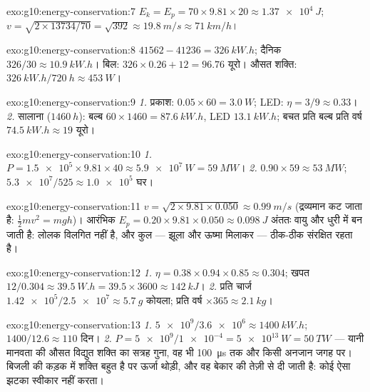 \begin{solution}{exo:g10:energy-conservation:7}
$E_k = E_p = 70 \times 9.81 \times 20 \approx \qty{1.37e4}{J}$; $v = \sqrt{2 \times 13734/70} = \sqrt{392} \approx \qty{19.8}{m/s}
\approx \qty{71}{km/h}$।
\end{solution}

\begin{solution}{exo:g10:energy-conservation:8}
$41562 - 41236 = \qty{326}{kW.h}$; दैनिक $326/30 \approx
\qty{10.9}{kW.h}$। बिल: $326 \times 0.26 + 12 = 96.76$ यूरो। औसत शक्ति: $\qty{326}{kW.h}/\qty{720}{h} \approx \qty{453}{W}$।
\end{solution}

\begin{solution}{exo:g10:energy-conservation:9}
\emph{1.} प्रकाश: $0.05 \times 60 = \qty{3.0}{W}$; LED: $\eta = 3/9 \approx 0.33$।
\emph{2.} सालाना ($\qty{1460}{h}$): बल्ब $60 \times 1460 = \qty{87.6}{kW.h}$, LED $\qty{13.1}{kW.h}$; बचत प्रति बल्ब प्रति
वर्ष $\qty{74.5}{kW.h} \approx 19$ यूरो।
\end{solution}

\begin{solution}{exo:g10:energy-conservation:10}
\emph{1.} $P = \num{1.5e5} \times 9.81 \times 40 \approx
\qty{5.9e7}{W} = \qty{59}{MW}$।
\emph{2.} $0.90 \times 59 \approx \qty{53}{MW}$; $\num{5.3e7}/525 \approx \num{1.0e5}$ घर।
\end{solution}

\begin{solution}{exo:g10:energy-conservation:11}
$v = \sqrt{2 \times 9.81 \times 0.050} \approx \qty{0.99}{m/s}$ (द्रव्यमान कट जाता है: $\tfrac12 m v^2 = mgh$)। आरंभिक $E_p = 0.20 \times 9.81 \times 0.050 \approx \qty{0.098}{J}$ अंततः वायु और धुरी
में  बन जाती है: लोलक विलगित नहीं है, और कुल --- झूला
और ऊष्मा मिलाकर --- ठीक-ठीक संरक्षित रहता है।
\end{solution}

\begin{solution}{exo:g10:energy-conservation:12}
\emph{1.} $\eta = 0.38 \times 0.94 \times 0.85 \approx 0.304$; खपत $12/0.304 \approx \qty{39.5}{W.h}
= 39.5 \times 3600 \approx \qty{142}{kJ}$।
\emph{2.} प्रति चार्ज $\num{1.42e5}/\num{2.5e7} \approx \qty{5.7}{g}$ कोयला; प्रति वर्ष $\times 365 \approx \qty{2.1}{kg}$।
\end{solution}

\begin{solution}{exo:g10:energy-conservation:13}
\emph{1.} $\num{5e9}/\num{3.6e6} \approx \qty{1400}{kW.h}$; $1400/12.6 \approx 110$ दिन।
\emph{2.} $P = \num{5e9}/\num{1e-4} = \qty{5e13}{W} = \qty{50}{TW}$ --- यानी मानवता की औसत विद्युत शक्ति का सत्रह
गुना, वह भी \qty{100}{\micro s} तक और किसी अनजान जगह पर। बिजली की कड़क में
शक्ति बहुत है पर ऊर्जा थोड़ी, और वह बेकार की तेज़ी से दी
जाती है: कोई  ऐसा झटका स्वीकार नहीं करता।
\end{solution}

